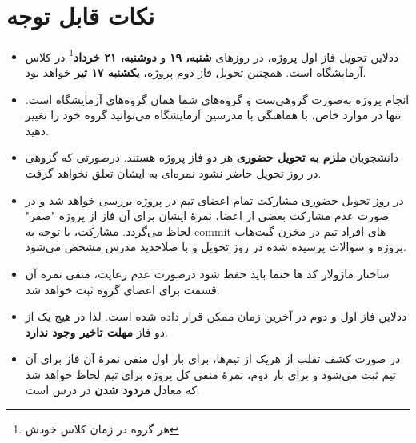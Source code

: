\documentclass[]{article}
\begin{document}
\newpage
\pagestyle{fancy}
\fancyhf{}
\fancyfoot{}
\cfoot{\thepage}
\renewcommand{\headrulewidth}{2pt}



\tableofcontents

\newpage

 \Large \textbf{\\
}

\section*{{\titr نکات قابل توجه}}
\begin{itemize}
	
\item 
ددلاین تحویل فاز اول پروژه، در روز‌های \textbf{شنبه، ۱۹} و \textbf{دوشنبه، ۲۱ خرداد}\footnote{هر گروه در زمان کلاس خودش} در کلاس آزمایشگاه است. همچنین تحویل فاز دوم پروژه، \textbf{یکشنبه ۱۷ تیر} خواهد بود.
	
\item
انجام پروژه به‌صورت گروهی‌ست و گروه‌های شما همان گروه‌های آزمایشگاه است. تنها در موارد خاص، با هماهنگی با مدرسین آزمایشگاه می‌توانید گروه خود را تغییر دهید.


\item
دانشجویان \textbf{ملزم به تحویل حضوری} هر دو فاز پروژه هستند. درصورتی که گروهی در روز تحویل حاضر نشود نمره‌ای به ایشان تعلق نخواهد گرفت.

\item
در روز تحویل حضوری مشارکت تمام اعضای تیم در پروژه بررسی خواهد‌ شد و در صورت عدم مشارکت بعضی از اعضا، نمرهٔ ایشان برای آن فاز از پروژه "صفر" لحاظ می‌گردد. مشارکت، با توجه به commit های افراد تیم در مخزن گیت‌هاب پروژه و سوالات پرسیده شده در روز تحویل و با صلاحدید مدرس مشخص می‌شود.

\item 
ساختار ماژولار کد ها حتما باید حفظ شود درصورت عدم رعایت، منفی نمره آن قسمت برای اعضای گروه ثبت خواهد شد.

\item
ددلاین فاز اول و دوم در آخرین زمان ممکن قرار داده شده است. لذا در هیچ یک از دو فاز \textbf{مهلت تاخیر وجود ندارد}.

\item
در صورت کشف تقلب از هریک از تیم‌ها، برای بار اول منفی نمرهٔ آن فاز برای آن تیم ثبت می‌شود و برای بار دوم، نمرهٔ منفی کل پروژه برای تیم لحاظ خواهد‌ شد که معادل \textbf{مردود شدن} در درس است.
\end{itemize}
\end{document}
